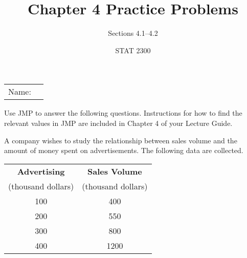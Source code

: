 \documentclass[noanswers]{exam}
\title{Chapter 4 Practice Problems}
\author{Sections 4.1--4.2}
\date{STAT 2300}
\begin{document}
\noindent\begin{tabular}{@{}p{.4in}p{3.5in}@{}}
Name: & \hrulefill
\end{tabular}

\vspace{2mm}

\noindent Use JMP to answer the following questions. Instructions for how to find the relevant values in JMP are included in Chapter 4 of your Lecture Guide.

\begin{questions} 

\question A company wishes to study the relationship between sales volume and the amount of money spent on advertisements. The following data are collected.

\begin{center}
\begin{tabular}{|c|c|}
\hline
\textbf{Advertising} & \textbf{Sales Volume} \\
(thousand dollars) & (thousand dollars) \\
\hline
100 & 400 \\
\hline
200 & 550 \\
\hline
300 & 800 \\
\hline
400 & 1200 \\
\hline
\end{tabular}
\end{center}

\vspace{2mm}

\end{questions}
\end{document}
